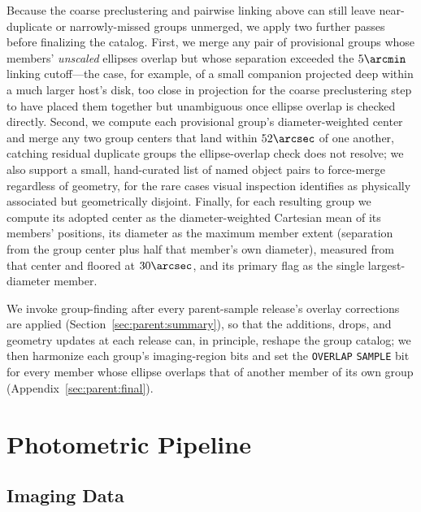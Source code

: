 \documentclass[modern,linenumbers]{aastex701}
\begin{document}
Because the coarse preclustering and pairwise linking above can still
leave near-duplicate or narrowly-missed groups unmerged, we apply two
further passes before finalizing the catalog. First, we merge any pair
of provisional groups whose members' \emph{unscaled} ellipses overlap
but whose separation exceeded the $5\arcmin$ linking cutoff---the case,
for example, of a small companion projected deep within a much larger
host's disk, too close in projection for the coarse preclustering step
to have placed them together but unambiguous once ellipse overlap is
checked directly. Second, we compute each provisional group's
diameter-weighted center and merge any two group centers that land
within $52\arcsec$ of one another, catching residual duplicate groups
the ellipse-overlap check does not resolve; we also support a small,
hand-curated list of named object pairs to force-merge regardless of
geometry, for the rare cases visual inspection identifies as physically
associated but geometrically disjoint. Finally, for each resulting
group we compute its adopted center as the diameter-weighted Cartesian
mean of its members' positions, its diameter as the maximum member
extent (separation from the group center plus half that member's own
diameter), measured from that center and floored at $30\arcsec$, and
its primary flag as the single largest-diameter member.

We invoke group-finding after every parent-sample release's overlay
corrections are applied (Section~\ref{sec:parent:summary}), so that the
additions, drops, and geometry updates at each release can, in
principle, reshape the group catalog; we then harmonize each group's
imaging-region bits and set the \texttt{OVERLAP} \texttt{SAMPLE} bit for
every member whose ellipse overlaps that of another member of its own
group (Appendix~\ref{sec:parent:final}).

\section{Photometric Pipeline}
\label{sec:pipeline}

\subsection{Imaging Data}
\label{sec:imaging}
\end{document}
